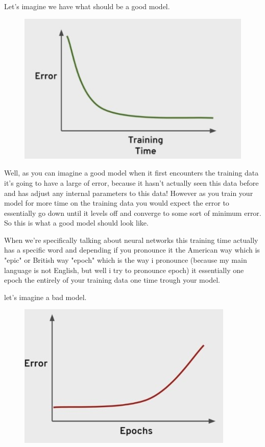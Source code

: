 \documentclass[12pt]{article}
\begin{document}
\begin{itemize}
	\Large Let's imagine we have what should be a good model.
	\begin{figure}[htbp]
\centerline{\includegraphics[scale=.5]{img/underfittingGoodModel.jpg}}
\end{figure}
	\small
	Well, as you can imagine a good model when it first encounters the training data it's going to have a large of error, because it hasn't actually seen this data before and has adjust any internal parameters to this data! However as you train your model for more time on the training data you would expect the error to essentially go down until it levels off and converge to some sort of minimum error. So this is what a good model should look like.
	
	 When we're specifically talking about neural networks this training time actually has a specific word and depending if you pronounce it the American way which is "epic" or British way "epoch" which is the way i pronounce (because my main language is not English, but well i try to pronounce epoch) it essentially one epoch the entirely of your training data one time trough your model.
	
	let's imagine a bad model.
	
	\begin{figure}[htbp]
\centerline{\includegraphics[scale=.5]{img/underfittingBadModel.jpg}}
\end{figure}
	

\end{itemize}
\end{document}
